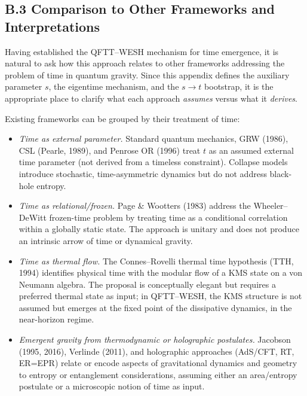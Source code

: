 \documentclass[12pt,a4paper]{article}
\numberwithin{equation}{section}
\begin{document}
\vspace{0.8cm}

\subsection*{B.3 Comparison to Other Frameworks and Interpretations}

\vspace{0.5cm}

Having established the QFTT--WESH mechanism for time emergence, it is natural to ask how this approach relates to other frameworks addressing the problem of time in quantum gravity. Since this appendix defines the auxiliary parameter $s$, the eigentime mechanism, and the $s \to t$ bootstrap, it is the appropriate place to clarify what each approach \emph{assumes} versus what it \emph{derives}.

\vspace{0.3cm}
\noindent Existing frameworks can be grouped by their treatment of time:

\begin{itemize}[leftmargin=1.2cm, itemsep=0.15cm]
\item[\textbf{(A)}] \textit{Time as external parameter.} Standard quantum mechanics, GRW (1986), CSL (Pearle, 1989), and Penrose OR (1996) treat $t$ as an assumed external time parameter (not derived from a timeless constraint). Collapse models introduce stochastic, time-asymmetric dynamics but do not address black-hole entropy.

\item[\textbf{(B)}] \textit{Time as relational/frozen.} Page \& Wootters (1983) address the Wheeler--DeWitt frozen-time problem by treating time as a conditional correlation within a globally static state. The approach is unitary and does not produce an intrinsic arrow of time or dynamical gravity.

\item[\textbf{(B$'$)}] \textit{Time as thermal flow.} The Connes--Rovelli thermal time hypothesis (TTH, 1994) identifies physical time with the modular flow of a KMS state on a von Neumann algebra. The proposal is conceptually elegant but requires a preferred thermal state as input; in QFTT--WESH, the KMS structure is not assumed but emerges at the fixed point of the dissipative dynamics, in the near-horizon regime.

\item[\textbf{(C)}] \textit{Emergent gravity from thermodynamic or holographic postulates.} Jacobson (1995, 2016), Verlinde (2011), and holographic approaches (AdS/CFT, RT, ER=EPR) relate or encode aspects of gravitational dynamics and geometry to entropy or entanglement considerations, assuming either an area/entropy postulate or a microscopic notion of time as input.
\end{itemize}
\end{document}
